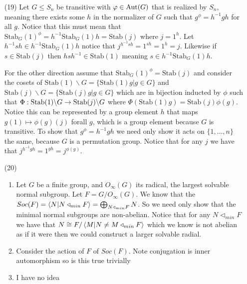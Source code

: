 \documentclass[12pt]{amsart}
\begin{document}
\begin{itemize}
\begin{enumerate}[label= (\alph*)]

   \end{enumerate}


   \item[(19)] Let $G\leq S_n$ be transitive with $\varphi\in\operatorname{\mathrm{Aut}}(G)$ that is realized by $S_n$, 
   meaning there exists some $h$ in the normalizer of $G$ such that $g^\phi=h^{-1}gh$ for all $g$.
   Notice that this must mean that $\text{Stab}_G(1)^\phi=h^{-1}\text{Stab}_G(1)h=\text{Stab}(j)$ where $j=1^h$.
   Let $h^{-1}sh\in h^{-1}\text{Stab}_G(1)h$ notice that $j^{h^{-1}sh}=1^{sh}=1^{h}=j$.
   Likewise if $s\in \text{Stab}(j)$ then $hsh^{-1}\in\text{Stab}(1)$ meaning $s\in h^{-1}\text{Stab}_G(1)h$.

   For the other direction assume that $\text{Stab}_G(1)^\phi=\text{Stab}(j)$ and consider the cosets of 
   $\text{Stab}(1)\backslash G=\{\text{Stab}(1) g | g\in G\}$ and 
   $\text{Stab}(j)\backslash G=\{\text{Stab}(j) g | g\in G\}$ which are in bijection inducted by $\phi$
   such that $\Phi: \text{Stab}(1)\backslash G\rightarrow \text{Stab}(j)\backslash G$ where 
   $\Phi(\text{Stab}(1) g)=\text{Stab}(j) \phi(g)$. Notice this can be represented by a group element 
   $h$ that maps $g(1)\mapsto \phi(g)(j)$ forall $g$, which is a group element because $G$ is transitive.
   To show that $g^\phi=h^{-1}gh$ we need only show it acts on $\{1,\dots, n\}$ the same, because $G$ is a permutation group.
   Notice that for any $j$ we have that $j^{h^{-1}gh}=1^{gh}=j^{\phi(g)}$.

   \item[(20)] 
   \begin{enumerate}[label= (\alph*)]
      \item Let $G$ be a finite group, and $O_\infty(G)$ its radical, the largest 
      solvable normal subgroup. Let $F=G/O_\infty(G)$. We know that the 
      $Soc(F)=\left\langle N | N\triangleleft_{min} F \right\rangle=\bigoplus_{N\triangleleft_{min} F} N$.
      So we need only show that the minimal normal subgroups are non-abelian.
      Notice that for any $N\triangleleft_{min} F$ we have that 
      $N\cong F/\left\langle M | N\neq M\triangleleft_{min} F \right\rangle$ which we know is not abelian as
      if it were then we could construct a larger solvable radial.
      \item Consider the action of $F$ of $Soc(F)$. Note conjugation is inner automorphism so is this true trivially
      \item I have no idea  
   \end{enumerate}


\end{itemize}
\end{document}
